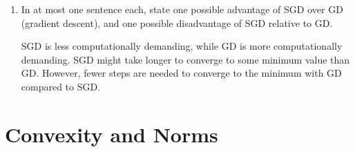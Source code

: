 \documentclass{article}
\begin{document}
\begin{aprob}
\begin{enumerate}
      \item {} In at most one sentence each, state one possible advantage of SGD over GD (gradient descent), and one possible disadvantage of SGD relative to GD.
      
      SGD is less computationally demanding, while GD is more computationally demanding. SGD might take longer to converge to some minimum value than GD. However, fewer steps are needed to converge to the minimum with GD compared to SGD.
      
    \end{enumerate}
    
\end{aprob}
\newpage 

\section*{Convexity and Norms }
\end{document}
